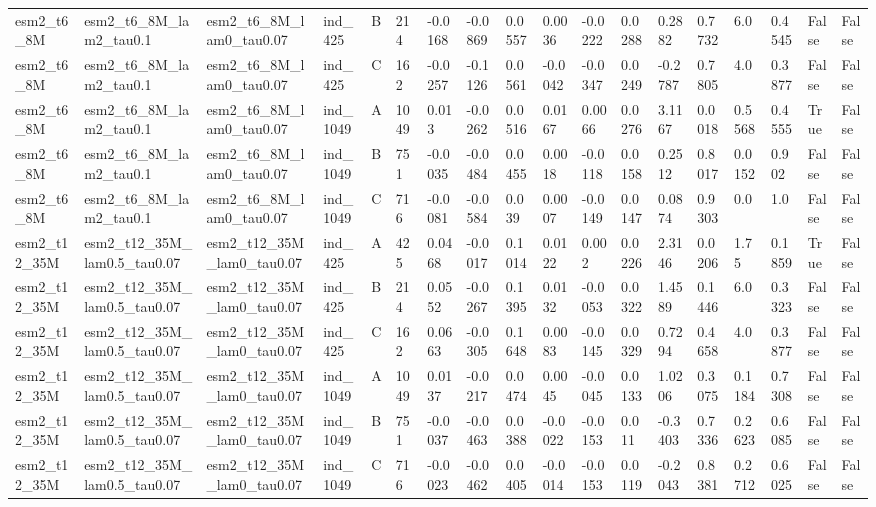 \begin{table}[ht]
\begin{tabular}{llllllllllllllllll}
esm2\_t6\_8M & esm2\_t6\_8M\_lam2\_tau0.1 & esm2\_t6\_8M\_lam0\_tau0.07 & ind\_425 & B & 214 & -0.0168 & -0.0869 & 0.0557 & 0.0036 & -0.0222 & 0.0288 & 0.2882 & 0.7732 & 6.0 & 0.4545 & False & False \\
esm2\_t6\_8M & esm2\_t6\_8M\_lam2\_tau0.1 & esm2\_t6\_8M\_lam0\_tau0.07 & ind\_425 & C & 162 & -0.0257 & -0.1126 & 0.0561 & -0.0042 & -0.0347 & 0.0249 & -0.2787 & 0.7805 & 4.0 & 0.3877 & False & False \\
esm2\_t6\_8M & esm2\_t6\_8M\_lam2\_tau0.1 & esm2\_t6\_8M\_lam0\_tau0.07 & ind\_1049 & A & 1049 & 0.013 & -0.0262 & 0.0516 & 0.0167 & 0.0066 & 0.0276 & 3.1167 & 0.0018 & 0.5568 & 0.4555 & True & False \\
esm2\_t6\_8M & esm2\_t6\_8M\_lam2\_tau0.1 & esm2\_t6\_8M\_lam0\_tau0.07 & ind\_1049 & B & 751 & -0.0035 & -0.0484 & 0.0455 & 0.0018 & -0.0118 & 0.0158 & 0.2512 & 0.8017 & 0.0152 & 0.902 & False & False \\
esm2\_t6\_8M & esm2\_t6\_8M\_lam2\_tau0.1 & esm2\_t6\_8M\_lam0\_tau0.07 & ind\_1049 & C & 716 & -0.0081 & -0.0584 & 0.039 & 0.0007 & -0.0149 & 0.0147 & 0.0874 & 0.9303 & 0.0 & 1.0 & False & False \\
esm2\_t12\_35M & esm2\_t12\_35M\_lam0.5\_tau0.07 & esm2\_t12\_35M\_lam0\_tau0.07 & ind\_425 & A & 425 & 0.0468 & -0.0017 & 0.1014 & 0.0122 & 0.002 & 0.0226 & 2.3146 & 0.0206 & 1.75 & 0.1859 & True & False \\
esm2\_t12\_35M & esm2\_t12\_35M\_lam0.5\_tau0.07 & esm2\_t12\_35M\_lam0\_tau0.07 & ind\_425 & B & 214 & 0.0552 & -0.0267 & 0.1395 & 0.0132 & -0.0053 & 0.0322 & 1.4589 & 0.1446 & 6.0 & 0.3323 & False & False \\
esm2\_t12\_35M & esm2\_t12\_35M\_lam0.5\_tau0.07 & esm2\_t12\_35M\_lam0\_tau0.07 & ind\_425 & C & 162 & 0.0663 & -0.0305 & 0.1648 & 0.0083 & -0.0145 & 0.0329 & 0.7294 & 0.4658 & 4.0 & 0.3877 & False & False \\
esm2\_t12\_35M & esm2\_t12\_35M\_lam0.5\_tau0.07 & esm2\_t12\_35M\_lam0\_tau0.07 & ind\_1049 & A & 1049 & 0.0137 & -0.0217 & 0.0474 & 0.0045 & -0.0045 & 0.0133 & 1.0206 & 0.3075 & 0.1184 & 0.7308 & False & False \\
esm2\_t12\_35M & esm2\_t12\_35M\_lam0.5\_tau0.07 & esm2\_t12\_35M\_lam0\_tau0.07 & ind\_1049 & B & 751 & -0.0037 & -0.0463 & 0.0388 & -0.0022 & -0.0153 & 0.011 & -0.3403 & 0.7336 & 0.2623 & 0.6085 & False & False \\
esm2\_t12\_35M & esm2\_t12\_35M\_lam0.5\_tau0.07 & esm2\_t12\_35M\_lam0\_tau0.07 & ind\_1049 & C & 716 & -0.0023 & -0.0462 & 0.0405 & -0.0014 & -0.0153 & 0.0119 & -0.2043 & 0.8381 & 0.2712 & 0.6025 & False & False \\

\end{tabular}
\end{table}
